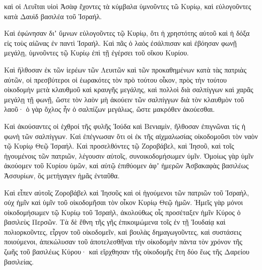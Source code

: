 {καὶ οἱ Λευῖται υἱοὶ Ἀσὰφ ἔχοντες τὰ κύμβαλα ὑμνοῦντες τῶ Κυρίῳ, καὶ εὐλογοῦντες κατὰ Δαυὶδ βασιλέα τοῦ Ἰσραήλ.
\par }{\PP {}Καὶ ἐφώνησαν διʼ ὕμνων εὐλογοῦντες τῷ Κυρίῳ, ὅτι ἡ χρηστότης αὐτοῦ καὶ ἡ δόξα εἰς τοὺς αἰῶνας ἐν παντὶ Ἰσραήλ.
Καὶ πᾶς ὁ λαὸς ἐσάλπισαν καὶ ἐβόησαν φωνῇ μεγάλῃ, ὑμνοῦντες τῷ Κυρίῳ ἐπὶ τῇ ἐγέρσει τοῦ οἴκου Κυρίου.
\par }{\PP {}Καὶ ἤλθοσαν ἐκ τῶν ἱερέων τῶν Λευιτῶν καὶ τῶν προκαθημένων κατὰ τὰς πατριὰς αὐτῶν, οἱ πρεσβύτεροι οἱ ἑωρακότες τὸν πρὸ τούτου οἶκον, πρὸς τὴν τούτου οἰκοδομὴν μετὰ κλαυθμοῦ καὶ κραυγῆς μεγάλης,
καὶ πολλοὶ διὰ σαλπίγγων καὶ χαρᾶς μεγάλῃ τῇ φωνῇ,
ὥστε τὸν λαὸν μὴ ἀκούειν τῶν σαλπίγγων διὰ τὸν κλαυθμὸν τοῦ λαοῦ· ὁ γὰρ ὄχλος ἦν ὁ σαλπίζων μεγάλως, ὥστε μακρόθεν ἀκούεσθαι.
\par }{\PP {}Καὶ ἀκούσαντες οἱ ἑχθροί τῆς φυλῆς Ἰούδα καὶ Βενιαμὶν, ἤλθοσαν ἐπιγνῶναι τίς ἡ φωνὴ τῶν σαλπίγγων.
Καὶ ἐπέγνωσαν ὅτι οἱ ἐκ τῆς αἰχμαλωσίας οἰκοδομοῦσι τὸν ναὸν τῷ Κυρίῳ Θεῷ Ἰσραήλ.
Καὶ προσελθόντες τῷ Ζοροβάβελ, καὶ Ἰησοῦ, καὶ τοῖς ἡγουμένοις τῶν πατριῶν, λέγουσιν αὐτοῖς, συνοικοδομήσωμεν ὑμῖν.
Ὁμοίως γὰρ ὑμῖν ἀκούομεν τοῦ Κυρίου ὑμῶν, καὶ αὐτῷ ἐπιθύομεν ἀφʼ ἡμερῶν Ἀσβακαφὰς βασιλέως Ἀσσυρίων, ὃς μετήγαγεν ἡμᾶς ἐνταῦθα.
\par }{\PP {}Καὶ εἶπεν αὐτοῖς Ζοροβάβελ καὶ Ἰησοῦς καὶ οἱ ἡγούμενοι τῶν πατριῶν τοῦ Ἰσραὴλ, οὐχ ἡμῖν καὶ ὑμῖν τοῦ οἰκοδομῆσαι τὸν οἶκον Κυρίῳ Θεῷ ἡμῶν.
Ἡμεῖς γὰρ μόνοι οἰκοδομήσωμεν τῷ Κυρίῳ τοῦ Ἰσραὴλ, ἀκολούθως οἷς προσέταξεν ἡμῖν Κύρος ὁ βασιλεὺς Περσῶν.
Τὰ δὲ ἔθνη τῆς γῆς ἐπικοιμώμενα τοῖς ἐν τῇ Ἰουδαίᾳ καὶ πολιορκοῦντες, εἶργον τοῦ οἰκοδομεῖν,
καὶ βουλὰς δημαγωγοῦντες, καὶ συστάσεις ποιούμενοι, ἀπεκώλυσαν τοῦ ἀποτελεσθῆναι τὴν οἰκοδομὴν πάντα τὸν χρόνον τῆς ζωῆς τοῦ βασιλέως Κύρου· καὶ εἴρχθησαν τῆς οἰκοδομῆς ἔτη δύο ἕως τῆς Δαρείου βασιλείας.

}
